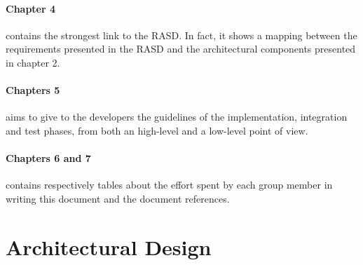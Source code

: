 \documentclass[]{article}
\begin{document}
			\paragraph{Chapter 4} contains the strongest link to the RASD. In fact, it shows a mapping between the requirements presented in the RASD and the architectural components presented in chapter 2.
			
			\paragraph{Chapters 5} aims to give to the developers the guidelines of the implementation, integration and test phases, from both an high-level and a low-level point of view.
		
			\paragraph{Chapters 6 and 7} contains respectively tables about the effort spent by each group member in writing this document and the document references.
			\newpage
			
		
		\section{Architectural Design}
			
\end{document}
